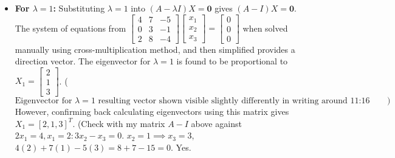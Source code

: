 \documentclass{article}
\begin{document}
    \begin{itemize}
        \item \textbf{For $\lambda = 1$:}
        Substituting $\lambda=1$ into $(A - \lambda I)X = \mathbf{0}$ gives $(A - I)X = \mathbf{0}$.
         The system of equations from $\begin{bmatrix} 4 & 7 & -5 \\ 0 & 3 & -1 \\ 2 & 8 & -4 \end{bmatrix} \begin{bmatrix} x_1 \\ x_2 \\ x_3 \end{bmatrix} = \begin{bmatrix} 0 \\ 0 \\ 0 \end{bmatrix}$ when solved manually using cross-multiplication method, and then simplified provides a direction vector. The eigenvector for $\lambda = 1$ is found to be proportional to $X_1 = \begin{bmatrix} 2 \\ 1 \\ 3 \end{bmatrix}$.
         ($\text{Eigenvector for }\lambda=1 \text{ resulting vector shown visible slightly differently in writing around 11:16 onwards like (x1,x2,x3) is (corresponding ratio denoms after simplification which simplifies values like 8/4/12 to 2/1/3)} )$ However, confirming back calculating eigenvectors using this matrix gives $X_1 = [2, 1, 3]^T$. (Check with my matrix $A-I$ above against $2x_1=4, x_1=2 : 3x_2-x_3=0$. $x_2=1 \implies x_3=3$, $4(2)+7(1)-5(3) = 8+7-15=0.$ Yes.


\end{itemize}
\end{document}
